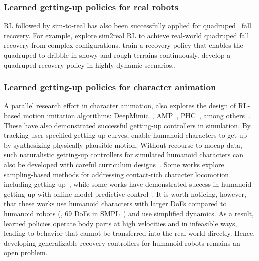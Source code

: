 \subsubsection{Learned getting-up policies for real robots} 
RL followed by sim-to-real has also been successfully applied for quadruped~\cite{AgileDynamicMotorSkills19,dribblebot2023,guardiansasyoufall2024,ma2023learning} fall recovery. 
For example, \citet{AgileDynamicMotorSkills19} explore sim2real RL to achieve real-world quadruped fall recovery from complex configurations.
\citet{dribblebot2023} train a recovery policy that enables the quadruped to dribble in snowy and rough terrains continuously.
\citet{guardiansasyoufall2024} develop a quadruped recovery policy in highly dynamic scenarios..

\subsubsection{Learned getting-up policies for character animation} A parallel research effort in character animation, also explores the design of RL-based motion imitation algorithms: DeepMimic~\cite{DeepMimic18}, AMP~\cite{AMP2021}, PHC~\cite{PHC23}, among others~\cite{PhysicsBasedMocapImitationDRL18,PULSE24,MaskedMimic24,HierachicalWorldModel25,CooHOI24,HOIHumanLevelInstruction24}. These have also demonstrated successful getting-up controllers in simulation. 
By tracking user-specified getting-up curves, \citet{frezzato2022synthesizing} enable humanoid characters to get up by synthesizing physically plausible motion.
Without recourse to mocap data, such naturalistic getting-up controllers for simulated humanoid characters can also be developed with careful curriculum designs~\cite{Learning2GetUp22}.
Some works explore sampling-based methods for addressing contact-rich character locomotion including getting up~\cite{SAMCONSamplingBasedContactRichMotion10,OnlineMotionSynthesis14,SampleEfficientCE21}, while some works have demonstrated success in humanoid getting up with online model-predictive control~\cite{OnlineTrajectoryOptimization12}.
It is worth noticing, however, that these works use humanoid characters with larger DoFs compared to humanoid robots (\eg, 69 DoFs in SMPL~\cite{SMPL15}) and use simplified dynamics.
As a result, learned policies operate body parts at high velocities and in infeasible ways, leading to behavior that cannot be transferred into the real world directly.
Hence, developing generalizable recovery controllers for humanoid robots remains an open problem. 


